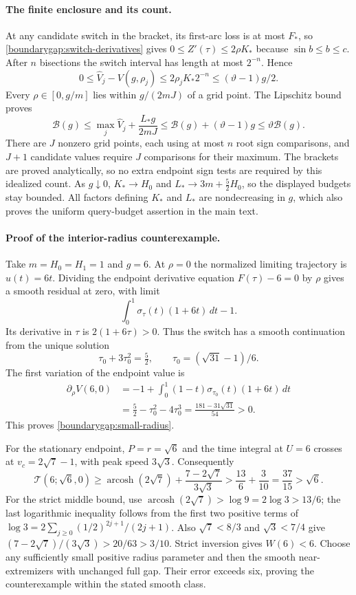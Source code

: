\paragraph{The finite enclosure and its count.}
At any candidate switch in the bracket, its first-arc loss is at most
$F_*$, so \eqref{boundarygap:switch-derivatives} gives
$0\le Z'(\tau)\le2\rho K_*$ because $\sin b\le b\le c$.
After $n$ bisections the switch interval has length at most $2^{-n}$.
Hence
\[
 0\le\widehat V_j-V(g,\rho_j)
       \le2\rho_jK_*2^{-n}\le(\vartheta-1)g/2.
\]
Every $\rho\in[0,g/m]$ lies within $g/(2mJ)$ of a grid point.  The
Lipschitz bound proves
\[
 \mathcal B(g)\le\max_j\widehat V_j+\frac{L_*g}{2mJ}
 \le\mathcal B(g)+(\vartheta-1)g\le\vartheta\mathcal B(g).
\]
There are $J$ nonzero grid points, each using at most $n$ root sign
comparisons, and $J+1$ candidate values require $J$ comparisons for
their maximum.  The brackets are proved analytically, so no extra
endpoint sign tests are required by this idealized count.
As $g\downarrow0$, $K_*\to H_0$ and
$L_*\to3m+\tfrac52H_0$, so the displayed budgets stay bounded.
All factors defining $K_*$ and $L_*$ are nondecreasing in $g$, which
also proves the uniform query-budget assertion in the main text.

\paragraph{Proof of the interior-radius counterexample.}
Take $m=H_0=H_1=1$ and $g=6$.  At $\rho=0$ the normalized limiting
trajectory is $u(t)=6t$.  Dividing the endpoint derivative equation
$F(\tau)-6=0$ by $\rho$ gives a smooth residual at zero, with limit
\[
 \int_0^1\sigma_\tau(t)(1+6t)\,dt-1.
\]
Its derivative in $\tau$ is $2(1+6\tau)>0$.  Thus the switch has a
smooth continuation from the unique solution
\[
 \tau_0+3\tau_0^2=\tfrac52,\qquad
 \tau_0=(\sqrt{31}-1)/6.
\]
The first variation of the endpoint value is
\begin{align*}
 \partial_\rho V(6,0)
 &=-1+\int_0^1(1-t)\sigma_{\tau_0}(t)(1+6t)\,dt\\
 &=\tfrac52-\tau_0^2-4\tau_0^3
   =\frac{181-31\sqrt{31}}{54}>0.
\end{align*}
This proves \eqref{boundarygap:small-radius}.

For the stationary endpoint, $P=r=\sqrt6$ and the time integral at
$U=6$ crosses at $v_c=2\sqrt7-1$, with peak speed $3\sqrt3$.
Consequently
\[
 \mathcal T(6;\sqrt6,0)
 \ge\operatorname{arcosh}(2\sqrt7)
       +\frac{7-2\sqrt7}{3\sqrt3}
 >\frac{13}{6}+\frac3{10}
 =\frac{37}{15}>\sqrt6.
\]
For the strict middle bound, use
$\operatorname{arcosh}(2\sqrt7)>\log9=2\log3>13/6$;
the last logarithmic inequality follows from the first two positive
terms of $\log3=2\sum_{j\ge0}(1/2)^{2j+1}/(2j+1)$.
Also $\sqrt7<8/3$ and $\sqrt3<7/4$ give
$(7-2\sqrt7)/(3\sqrt3)>20/63>3/10$.
Strict inversion gives $W(6)<6$.  Choose any sufficiently small
positive radius parameter and then the smooth near-extremizers with
unchanged full gap.  Their error exceeds six, proving the counterexample
within the stated smooth class.
